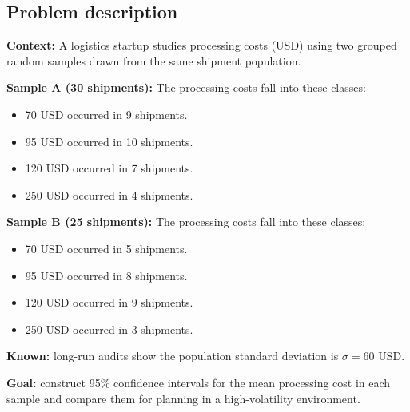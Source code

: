 

	
	\begin{ExamProblems}
		\item
		\subsection*{Problem description}
		\textbf{Context:} A logistics startup studies processing costs (USD) using two grouped random samples drawn from the same shipment population.
		
		\textbf{Sample A (30 shipments):} The processing costs fall into these classes:
		\begin{itemize}
			\item 70 USD occurred in 9 shipments.
			\item 95 USD occurred in 10 shipments.
			\item 120 USD occurred in 7 shipments.
			\item 250 USD occurred in 4 shipments.
		\end{itemize}
		
		\textbf{Sample B (25 shipments):} The processing costs fall into these classes:
		\begin{itemize}
			\item 70 USD occurred in 5 shipments.
			\item 95 USD occurred in 8 shipments.
			\item 120 USD occurred in 9 shipments.
			\item 250 USD occurred in 3 shipments.
		\end{itemize}
		
		\textbf{Known:} long-run audits show the population standard deviation is $\sigma = 60$ USD.
		
		\textbf{Goal:} construct 95\% confidence intervals for the mean processing cost in each sample and compare them for planning in a high-volatility environment.
		

\end{ExamProblems}
